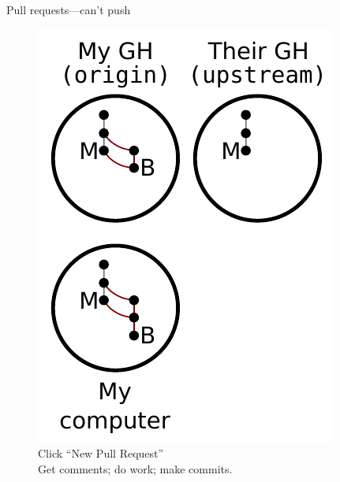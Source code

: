 \begin{frame}{Pull requests---can't push}
  \begin{figure}
    \includegraphics{fork_011.pdf}
    \\ Click ``New Pull Request''
    \\ Get comments; do work; make commits.
  \end{figure}
\end{frame}

